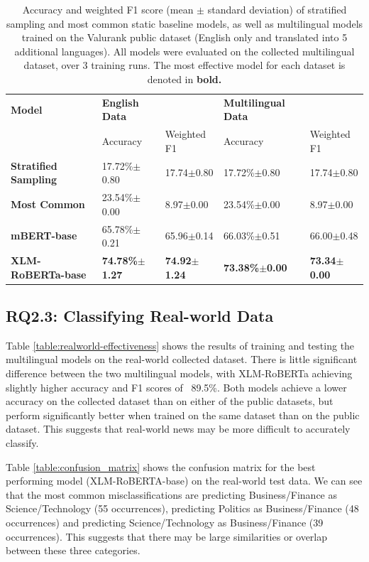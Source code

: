 \documentclass{l4proj}
\begin{document}
\begin{table}[h]
\begin{tabular}{lllll}
\hline
\textbf{Model}               & \textbf{English Data} &             & \textbf{Multilingual Data} &             \\ \cline{2-5} 
                             & Accuracy              & Weighted F1 & Accuracy                   & Weighted F1 \\ \hline
\textbf{Stratified Sampling} & 17.72\%$\pm$0.80     & 17.74$\pm$0.80 & 17.72\%$\pm$0.80     & 17.74$\pm$0.80            \\
\textbf{Most Common}         & 23.54\%$\pm$0.00     & 8.97$\pm$0.00 & 23.54\%$\pm$0.00     & 8.97$\pm$0.00 \\ \hline
\textbf{mBERT-base}          & 65.78\%$\pm$0.21     & 65.96$\pm$0.14         & 66.03\%$\pm$0.51        & 66.00$\pm$0.48         \\
\textbf{XLM-RoBERTa-base}    & \textbf{74.78\%$\pm$1.27}  & \textbf{74.92$\pm$1.24}        & \textbf{73.38\%$\pm$0.00}   & \textbf{73.34$\pm$0.00}        \\ \hline
\end{tabular}
\caption{Accuracy and weighted F1 score (mean $\pm$ standard deviation) of stratified sampling and most common static baseline models, as well as multilingual models trained on the Valurank public dataset (English only and translated into 5 additional languages). All models were evaluated on the collected multilingual dataset, over 3 training runs. The most effective model for each dataset is denoted in \textbf{bold.}}
\label{table:transferability}
\end{table}

\subsection{RQ2.3: Classifying Real-world Data}

Table \ref{table:realworld-effectiveness} shows the results of training and testing the multilingual models on the real-world collected dataset. There is little significant difference between the two multilingual models, with XLM-RoBERTa achieving slightly higher accuracy and F1 scores of ~89.5\%. Both models achieve a lower accuracy on the collected dataset than on either of the public datasets, but perform significantly better when trained on the same dataset than on the public dataset. This suggests that real-world news may be more difficult to accurately classify. \par
Table \ref{table:confusion_matrix} shows the confusion matrix for the best performing model (XLM-RoBERTA-base) on the real-world test data. We can see that the most common misclassifications are predicting Business/Finance as Science/Technology (55 occurrences), predicting Politics as Business/Finance (48 occurrences) and predicting Science/Technology as Business/Finance (39 occurrences). This suggests that there may be large similarities or overlap between these three categories.
\end{document}
